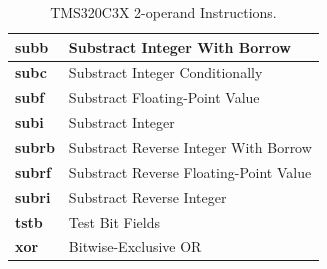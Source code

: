 \begin{table}[!p]
\begin{center}
\begin{tabular}{|p{3.0cm}|p{10.0cm}|}
	\hline
	\textbf{subb} & Substract Integer With Borrow\\
	\hline
	\textbf{subc} & Substract Integer Conditionally\\
	\hline
	\textbf{subf} & Substract Floating-Point Value\\
	\hline
	\textbf{subi} & Substract Integer\\
	\hline
	\textbf{subrb} & Substract Reverse Integer With Borrow\\
	\hline
	\textbf{subrf} & Substract Reverse Floating-Point Value\\
	\hline
	\textbf{subri} & Substract Reverse Integer\\
	\hline
	\textbf{tstb} & Test Bit Fields\\
	\hline
	\textbf{xor} & Bitwise-Exclusive OR\\
	\hline
	\end{tabular}
	\caption{\label{table:tms320c3x_2ops_instructions} TMS320C3X 2-operand Instructions.}
\end{center}
\end{table}

